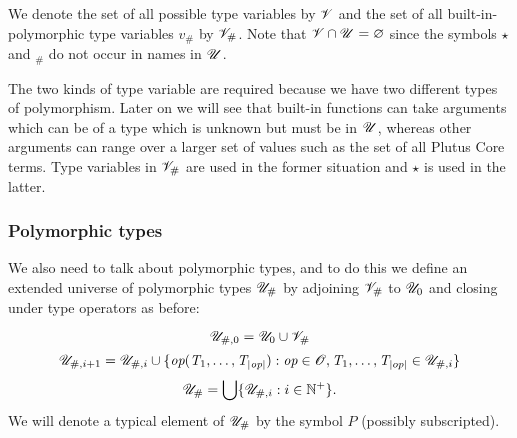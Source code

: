 
\medskip
\noindent
We denote the set of all possible type variables by $\mathscr{V}$ and the set of all
built-in-polymorphic type variables $v_\#$ by $\mathscr{V}_\#$.  Note that $\mathscr{V} \cap
\mathscr{U} = \varnothing$ since the symbols $\star$ and ${}_\#$ do not occur in names in $\mathscr{U}$.%
%
%
%
%

The two kinds of type variable are required because we have two different types
of polymorphism. Later on we will see that built-in functions can take arguments
which can be of a type which is unknown but must be in $\mathscr{U}$, whereas other
arguments can range over a larger set of values such as the set of all Plutus
Core terms. Type variables in $\mathscr{V}_\#$ are used in the former situation and
$\star$ is used in the latter.


\subsubsection{Polymorphic types}
\label{sec:polymorphic-types}
We also need to talk about polymorphic types, and to do this we define an
extended universe of polymorphic types ${\mathscr{U}_{\#}}$ by adjoining $\mathscr{V}_\#$ to
$\mathscr{U}_0$ and closing under type operators as before:

$$
\mathscr{U}_{\#,0} = \mathscr{U}_0 \cup \mathscr{V}_\#
$$
$$
\mathscr{U}_{\#,i+1} = \mathscr{U}_{\#,i} \cup \{\textit{op}(\textit{T}_1, \ldots, \textit{T}_{\left| \textit{op} \right|}): \textit{op} \in \mathscr{O}, \textit{T}_1, \ldots, \textit{T}_{\left| op \right|} \in \mathscr{U}_{\#,i}\}
$$
$$
{\mathscr{U}_{\#}} = \bigcup\{\mathscr{U}_{\#,i}: i \in \mathbb{N}^{+}\}.$$%
%
\noindent We will denote a typical element of ${\mathscr{U}_{\#}}$ by the symbol $P$
(possibly subscripted).%


